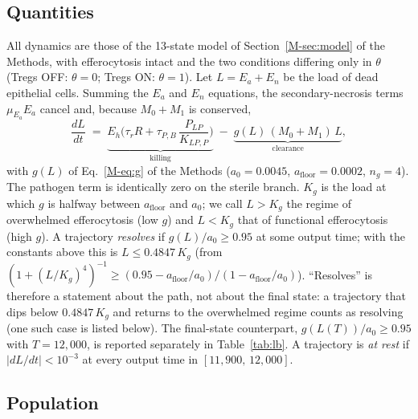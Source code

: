 \documentclass[11pt]{article}
\begin{document}
\subsection{Quantities}

All dynamics are those of the 13-state model of Section~\ref{M-sec:model} of the Methods, with
efferocytosis intact and the two conditions differing only in $\theta$
(Tregs OFF: $\theta=0$; Tregs ON: $\theta=1$). Let
$L = E_a + E_n$ be the load of dead epithelial cells. Summing the $E_a$ and $E_n$
equations, the secondary-necrosis terms $\mu_{E_a}E_a$ cancel and, because $M_0+M_1$ is
conserved,
\begin{equation}
  \frac{dL}{dt} \;=\;
  \underbrace{E_h\Big(\tau_r R + \tau_{P,B}\,\frac{P_{LP}}{K_{LP,P}}\Big)}_{\text{killing}}
  \;-\;
  \underbrace{g(L)\,(M_0+M_1)\,L}_{\text{clearance}},
  \label{eq:lb}
\end{equation}
with $g(L)$ of Eq.~\ref{M-eq:g} of the Methods ($a_0 = 0.0045$, $a_{\mathrm{floor}} = 0.0002$, $n_g = 4$). The pathogen term is
identically zero on the sterile branch. $K_g$ is the load at which $g$ is halfway between
$a_{\mathrm{floor}}$ and $a_0$; we call $L > K_g$ the regime of overwhelmed efferocytosis
(low $g$) and $L < K_g$ that of functional efferocytosis (high $g$). A trajectory
\emph{resolves} if $g(L)/a_0 \ge 0.95$ at some output time; with the constants above this is
$L \le 0.4847\,K_g$ (from $(1+(L/K_g)^4)^{-1} \ge (0.95-a_{\mathrm{floor}}/a_0)/(1-a_{\mathrm{floor}}/a_0)$).
``Resolves'' is therefore a statement about the path, not about the final state: a
trajectory that dips below $0.4847\,K_g$ and returns to the overwhelmed regime counts as
resolving (one such case is listed below). The final-state counterpart, $g(L(T))/a_0\ge0.95$ with $T = 12{,}000$,
is reported separately in Table~\ref{tab:lb}. A trajectory is \emph{at rest} if
$|dL/dt| < 10^{-3}$ at every output time in $[11{,}900,\,12{,}000]$.

\subsection{Population}
\end{document}
